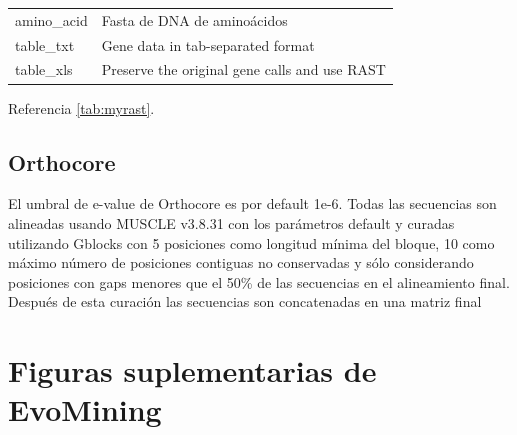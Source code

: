 \documentclass[12pt,twoside]{reedthesis}
\begin{document}
\begin{longtable}[]{@{}ll@{}}
  \begin{minipage}[t]{0.22\columnwidth}\raggedright\strut
  amino\_acid\strut
  \end{minipage} & \begin{minipage}[t]{0.72\columnwidth}\raggedright\strut
  Fasta de DNA de aminoácidos\strut
  \end{minipage}\tabularnewline
  \begin{minipage}[t]{0.22\columnwidth}\raggedright\strut
  table\_txt\strut
  \end{minipage} & \begin{minipage}[t]{0.72\columnwidth}\raggedright\strut
  Gene data in tab-separated format\strut
  \end{minipage}\tabularnewline
  \begin{minipage}[t]{0.22\columnwidth}\raggedright\strut
  table\_xls\strut
  \end{minipage} & \begin{minipage}[t]{0.72\columnwidth}\raggedright\strut
  Preserve the original gene calls and use RAST\strut
  \end{minipage}\tabularnewline
  \bottomrule
  \end{longtable}
  
  Referencia \autoref{tab:myrast}.
  
  \section{Orthocore}\label{orthocore}
  
  El umbral de e-value de Orthocore es por default 1e-6. Todas las
  secuencias son alineadas usando MUSCLE v3.8.31 con los parámetros
  default y curadas utilizando Gblocks con 5 posiciones como longitud
  mínima del bloque, 10 como máximo número de posiciones contiguas no
  conservadas y sólo considerando posiciones con gaps menores que el 50\%
  de las secuencias en el alineamiento final. Después de esta curación las
  secuencias son concatenadas en una matriz final
  
  \appendix
  
  \chapter{Figuras suplementarias de
  EvoMining}\label{figuras-suplementarias-de-evomining}
  
\end{document}
